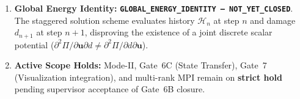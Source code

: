 \begin{enumerate}[label=\textbf{\arabic*.},leftmargin=6mm,itemsep=2pt]
\begin{itemize}[leftmargin=4mm,itemsep=1pt]
    \item \textbf{Active Solver Solves on \texttt{/scratch9/}:} Actively tracking spatial candidate Job \texttt{1410179} (58k FE), convergence-control diagnostic Job \texttt{1410180} ($C_n=0.50$), and errorTarget fracture batch Jobs \texttt{1410357}--\texttt{1410359} (ET2, ET3, ET5).
  \end{itemize}
  \item \textbf{Global Energy Identity:} \textbf{\texttt{GLOBAL\_ENERGY\_IDENTITY --- NOT\_YET\_CLOSED}}. The staggered solution scheme evaluates history $\mathcal{H}_n$ at step $n$ and damage $d_{n+1}$ at step $n+1$, disproving the existence of a joint discrete scalar potential ($\partial^2 \Pi / \partial \mathbf{u} \partial d \ne \partial^2 \Pi / \partial d \partial \mathbf{u}$).
  \item \textbf{Active Scope Holds:} Mode-II, Gate~6C (State Transfer), Gate~7 (Visualization integration), and multi-rank MPI remain on \textbf{strict hold} pending supervisor acceptance of Gate~6B closure.
\end{enumerate}

